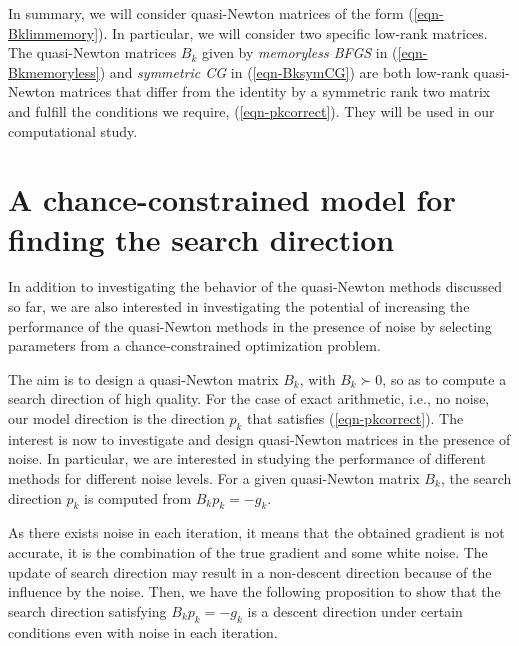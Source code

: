 \documentclass[11pt,twoside]{article}
\begin{document}
In summary, we will consider quasi-Newton matrices of the form
(\ref{eqn-Bklimmemory}). In particular, we will consider two specific
low-rank matrices. The quasi-Newton matrices $B_k$ given by
\emph{memoryless BFGS} in (\ref{eqn-Bkmemoryless}) and \emph{symmetric
  CG} in (\ref{eqn-BksymCG}) are both low-rank quasi-Newton matrices
that differ from the identity by a symmetric rank two matrix and
fulfill the conditions we require, (\ref{eqn-pkcorrect}). They will be
used in our computational study.

\section{A chance-constrained model for finding the search
  direction}\label{sec-model}

In addition to investigating the behavior of the quasi-Newton methods
discussed so far, we are also interested in investigating the
potential of increasing the performance of the quasi-Newton methods in
the presence of noise by selecting parameters from a
chance-constrained optimization problem.

The aim is to design a quasi-Newton matrix $B_k$, with $B_k\succ 0$,
so as to compute a search direction of high quality.  For the case of
exact arithmetic, i.e., no noise, our model direction is the direction
$p_k$ that satisfies (\ref{eqn-pkcorrect}). The interest is now to
investigate and design quasi-Newton matrices in the presence of
noise. In particular, we are interested in studying the performance of
different methods for different noise levels. For a given quasi-Newton
matrix $B_k$, the search direction $p_k$ is computed from $B_k p_k =
-g_k$.

  As there exists noise in each iteration, it means that the obtained
  gradient is not accurate, it is the combination of the true
  gradient and some white noise.  The update of search direction may
  result in a non-descent direction because of the influence by the
  noise.  Then, we have the following proposition to show that the
  search direction satisfying $B_k p_k = -g_k$ is a descent direction
  under certain conditions even with noise in each iteration.
\end{document}
